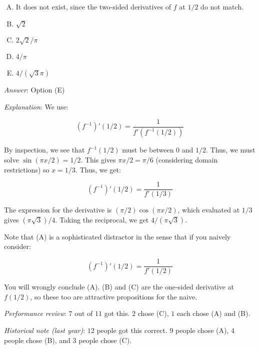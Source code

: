 \documentclass[10pt]{amsart}
\begin{document}
\begin{enumerate}
  \begin{enumerate}[(A)]
  \item It does not exist, since the two-sided derivatives of $f$ at
    $1/2$ do not match.
  \item $\sqrt{2}$
  \item $2\sqrt{2}/\pi$
  \item $4/\pi$
  \item $4/(\sqrt{3}\pi)$
  \end{enumerate}

  {\em Answer}: Option (E)

  {\em Explanation}: We use:

  $$(f^{-1})'(1/2) = \frac{1}{f'(f^{-1}(1/2))}$$

  By inspection, we see that $f^{-1}(1/2)$ must be between $0$ and
  $1/2$. Thus, we must solve $\sin(\pi x/2) = 1/2$. This gives $\pi x
  / 2 = \pi/6$ (considering domain restrictions) so $x = 1/3$. Thus, we get:

  $$(f^{-1})'(1/2) = \frac{1}{f'(1/3)}$$

  The expression for the derivative is $(\pi/2)\cos(\pi x/2)$, which
  evaluated at $1/3$ gives $(\pi\sqrt{3})/4$. Taking the reciprocal,
  we get $4/(\pi\sqrt{3})$.

  Note that (A) is a sophisticated distractor in the sense that if you
  naively consider:

  $$(f^{-1})'(1/2) = \frac{1}{f'(1/2)}$$

  You will wrongly conclude (A). (B) and (C) are the one-sided
  derivative at $f(1/2)$, so these too are attractive propositions for
  the naive.

  {\em Performance review}: $7$ out of $11$ got this. $2$ chose (C),
  $1$ each chose (A) and (B).

  {\em Historical note (last year)}: $12$ people got this correct. $9$
  people chose (A), $4$ people chose (B), and $3$ people chose (C).
\end{enumerate}
\end{document}

